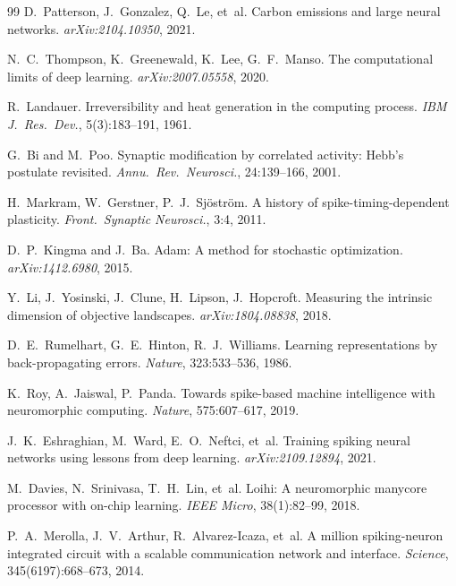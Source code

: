 \documentclass[11pt]{article}
\theoremstyle{definition}
\theoremstyle{remark}
\begin{document}
\begin{thebibliography}{99}
D.~Patterson, J.~Gonzalez, Q.~Le, et~al.
\newblock Carbon emissions and large neural networks.
\newblock \emph{arXiv:2104.10350}, 2021.

N.~C.~Thompson, K.~Greenewald, K.~Lee, G.~F.~Manso.
\newblock The computational limits of deep learning.
\newblock \emph{arXiv:2007.05558}, 2020.

R.~Landauer.
\newblock Irreversibility and heat generation in the computing process.
\newblock \emph{IBM J.~Res.~Dev.}, 5(3):183--191, 1961.

G.~Bi and M.~Poo.
\newblock Synaptic modification by correlated activity: Hebb's postulate
  revisited.
\newblock \emph{Annu.~Rev.~Neurosci.}, 24:139--166, 2001.

H.~Markram, W.~Gerstner, P.~J.~Sj\"ostr\"om.
\newblock A history of spike-timing-dependent plasticity.
\newblock \emph{Front.~Synaptic Neurosci.}, 3:4, 2011.

D.~P.~Kingma and J.~Ba.
\newblock Adam: A method for stochastic optimization.
\newblock \emph{arXiv:1412.6980}, 2015.

Y.~Li, J.~Yosinski, J.~Clune, H.~Lipson, J.~Hopcroft.
\newblock Measuring the intrinsic dimension of objective landscapes.
\newblock \emph{arXiv:1804.08838}, 2018.

D.~E.~Rumelhart, G.~E.~Hinton, R.~J.~Williams.
\newblock Learning representations by back-propagating errors.
\newblock \emph{Nature}, 323:533--536, 1986.

K.~Roy, A.~Jaiswal, P.~Panda.
\newblock Towards spike-based machine intelligence with neuromorphic
  computing.
\newblock \emph{Nature}, 575:607--617, 2019.

J.~K.~Eshraghian, M.~Ward, E.~O.~Neftci, et~al.
\newblock Training spiking neural networks using lessons from deep
  learning.
\newblock \emph{arXiv:2109.12894}, 2021.

M.~Davies, N.~Srinivasa, T.~H.~Lin, et~al.
\newblock Loihi: A neuromorphic manycore processor with on-chip learning.
\newblock \emph{IEEE Micro}, 38(1):82--99, 2018.

P.~A.~Merolla, J.~V.~Arthur, R.~Alvarez-Icaza, et~al.
\newblock A million spiking-neuron integrated circuit with a scalable
  communication network and interface.
\newblock \emph{Science}, 345(6197):668--673, 2014.


\end{thebibliography}
\end{document}
